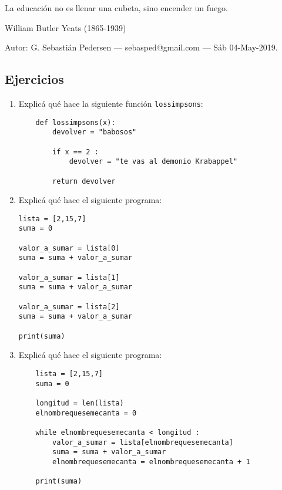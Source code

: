 \documentclass[a4paper,11pt,landscape,twocolumn]{article}
\begin{document}
\epigraph{La educación no es llenar una cubeta, sino encender un fuego.}{William Butler Yeats (1865-1939)}	
\noindent Autor: G. Sebastián Pedersen --- sebasped@gmail.com --- Sáb 04-May-2019.
\subsection*{Ejercicios} 
\begin{enumerate}
	\item Explicá qué hace la siguiente función \verb|lossimpsons|:
	\begin{verbatim}
	def lossimpsons(x):
	    devolver = "babosos"
	    
	    if x == 2 :
	        devolver = "te vas al demonio Krabappel"    
	    
	    return devolver
	\end{verbatim}

\item Explicá qué hace el siguiente programa:
\begin{verbatim}
lista = [2,15,7]
suma = 0

valor_a_sumar = lista[0]
suma = suma + valor_a_sumar

valor_a_sumar = lista[1]
suma = suma + valor_a_sumar

valor_a_sumar = lista[2]
suma = suma + valor_a_sumar

print(suma)
\end{verbatim}
\newpage
	\item Explicá qué hace el siguiente programa:
	\begin{verbatim}
	lista = [2,15,7]
	suma = 0
	
	longitud = len(lista)
	elnombrequesemecanta = 0
	
	while elnombrequesemecanta < longitud :
	    valor_a_sumar = lista[elnombrequesemecanta]
	    suma = suma + valor_a_sumar
	    elnombrequesemecanta = elnombrequesemecanta + 1
	
	print(suma)
	\end{verbatim}



\end{enumerate}
\end{document}
